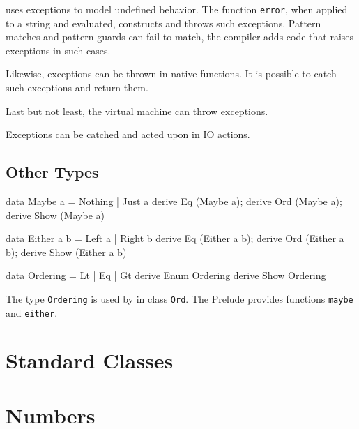 \frege{} uses \java{} exceptions to model undefined behavior.
The function \texttt{error}, when applied to a string and evaluated, 
constructs and throws such exceptions. Pattern matches and pattern guards
can fail to match, the compiler adds code that raises exceptions in such cases.

Likewise, exceptions can be thrown in native functions. It is possible
to catch such exceptions and return them.

Last but not least, the \java{} virtual machine can throw exceptions. 

Exceptions can be catched and acted upon in IO actions. 


\subsection{Other Types}

\begin{code}
data Maybe a = Nothing | Just a
derive Eq (Maybe a); derive Ord (Maybe a); derive Show (Maybe a)

data Either a b = Left a | Right b
derive Eq (Either a b); derive Ord (Either a b);
derive Show (Either a b)

data Ordering = Lt | Eq | Gt
derive Enum Ordering
derive Show Ordering
\end{code}

The type \texttt{Ordering} is used by \sym{(<=>)} in class \texttt{Ord}.
The Prelude provides functions \texttt{maybe} and \texttt{either}.

\section{Standard \frege{} Classes} \label{std-classes} 



\section{Numbers} \label{numeric} 

